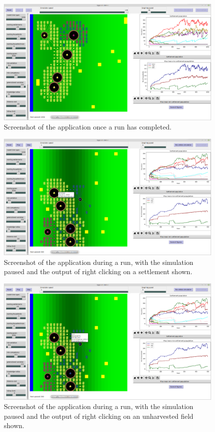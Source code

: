 \documentclass[12pt]{article}
\begin{document}
	\begin{figure}[!htb]
		\includegraphics[width=15cm]{FinishedRunning}
		\caption{Screenshot of the application once a run has completed.}
		\label{fig:FinishedRunning}
	\end{figure}
	
	\begin{figure}[!htb]
		\includegraphics[width=15cm]{RightClickOnSettlement}
		\caption{Screenshot of the application during a run, with the simulation paused and the output of right clicking on a settlement shown.}
		\label{fig:ClickOnSettlement}
	\end{figure}
	
	\begin{figure}[!htb]
		\includegraphics[width=15cm]{RightClickOnNotHarvestedField}
		\caption{Screenshot of the application during a run, with the simulation paused and the output of right clicking on an unharvested field shown.}
		\label{fig:ClickOnUnharvested}
	\end{figure}
	
\end{document}
